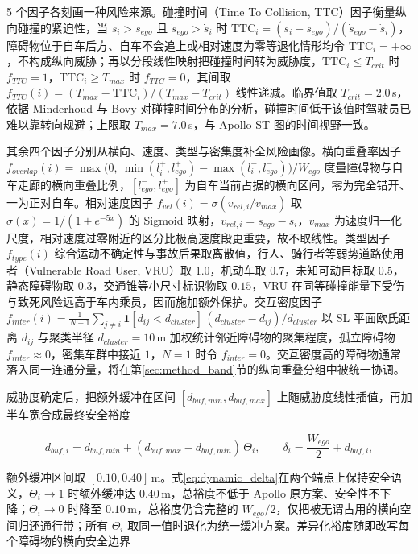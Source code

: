 \documentclass[a4paper,zihao=5]{ctexart}
\theoremstyle{definition}
\begin{document}
5 个因子各刻画一种风险来源。碰撞时间（Time To Collision, TTC）因子衡量纵向碰撞的紧迫性，当 $s_i > s_{ego}$ 且 $\dot{s}_{ego} > \dot{s}_i$ 时 $\mathrm{TTC}_i = (s_i - s_{ego})/(\dot{s}_{ego} - \dot{s}_i)$，障碍物位于自车后方、自车不会追上或相对速度为零等退化情形均令 $\mathrm{TTC}_i=+\infty$，不构成纵向威胁；再以分段线性映射把碰撞时间转为威胁度，$\mathrm{TTC}_i \leq T_{crit}$ 时 $f_{TTC}=1$，$\mathrm{TTC}_i \geq T_{max}$ 时 $f_{TTC}=0$，其间取 $f_{TTC}(i) = (T_{max} - \mathrm{TTC}_i)/(T_{max} - T_{crit})$ 线性递减。临界值取 $T_{crit}=2.0$\,s，依据 Minderhoud 与 Bovy 对碰撞时间分布的分析\citep{minderhoud2001extended}，碰撞时间低于该值时驾驶员已难以靠转向规避；上限取 $T_{max}=7.0$\,s，与 Apollo ST 图的时间视野一致。

其余四个因子分别从横向、速度、类型与密集度补全风险画像。横向重叠率因子 $f_{overlap}(i)=\max\!\big(0,\ \min(l_i^{+}, l_{ego}^{+}) - \max(l_i^{-}, l_{ego}^{-})\big)/W_{ego}$ 度量障碍物与自车走廊的横向重叠比例，$[l_{ego}^{-}, l_{ego}^{+}]$ 为自车当前占据的横向区间，零为完全错开、一为正对自车。相对速度因子 $f_{vel}(i)=\sigma(v_{rel,i}/v_{max})$ 取 $\sigma(x)=1/(1+e^{-5x})$ 的 Sigmoid 映射，$v_{rel,i}=\dot{s}_{ego}-\dot{s}_i$，$v_{max}$ 为速度归一化尺度，相对速度过零附近的区分比极高速度段更重要，故不取线性。类型因子 $f_{type}(i)$ 综合运动不确定性与事故后果取离散值，行人、骑行者等弱势道路使用者（Vulnerable Road User, VRU）取 $1.0$，机动车取 $0.7$，未知可动目标取 $0.5$，静态障碍物取 $0.3$，交通锥等小尺寸标识物取 $0.15$，VRU 在同等碰撞能量下受伤与致死风险远高于车内乘员，因而施加额外保护。交互密度因子 $f_{inter}(i) = \frac{1}{N-1} \sum_{j \neq i} \mathbf{1}[d_{ij} < d_{cluster}] \,(d_{cluster} - d_{ij})/d_{cluster}$ 以 SL 平面欧氏距离 $d_{ij}$ 与聚类半径 $d_{cluster}=10$\,m 加权统计邻近障碍物的聚集程度，孤立障碍物 $f_{inter}\approx 0$，密集车群中接近 $1$，$N=1$ 时令 $f_{inter}=0$。交互密度高的障碍物通常落入同一连通分量，将在第\ref{sec:method_band}节的纵向重叠分组中被统一协调。

威胁度确定后，把额外缓冲在区间 $[d_{buf,min}, d_{buf,max}]$ 上随威胁度线性插值，再加半车宽合成最终安全裕度

\begin{equation}
    d_{buf,i} = d_{buf,min} + (d_{buf,max} - d_{buf,min})\,\Theta_i, \qquad
    \delta_i = \frac{W_{ego}}{2} + d_{buf,i},
    \label{eq:dynamic_delta}
\end{equation}

额外缓冲区间取 $[0.10, 0.40]$\,m。式\eqref{eq:dynamic_delta}在两个端点上保持安全语义，$\Theta_i \to 1$ 时额外缓冲达 $0.40$\,m，总裕度不低于 Apollo 原方案、安全性不下降；$\Theta_i \to 0$ 时降至 $0.10$\,m，总裕度仍含完整的 $W_{ego}/2$，仅把被无谓占用的横向空间归还通行带；所有 $\Theta_i$ 取同一值时退化为统一缓冲方案。差异化裕度随即改写每个障碍物的横向安全边界
\end{document}
